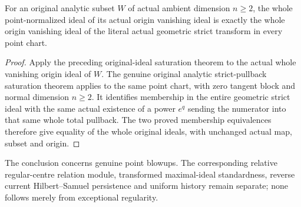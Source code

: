 \begin{corollary}
\label{hir:actual-original-point-normalized-geometric-strict-ideal}
\leanok
For an original analytic subset $W$ of actual ambient dimension $n\ge2$,
the whole point-normalized ideal of its actual origin vanishing ideal is
exactly the whole origin vanishing ideal of the literal actual geometric
strict transform in every point chart.
\end{corollary}
\begin{proof}
Apply the preceding original-ideal saturation theorem to the actual
whole vanishing origin ideal of $W$. The genuine original analytic
strict-pullback saturation theorem applies to the same point chart,
with zero tangent block and normal dimension $n\ge2$. It identifies
membership in the entire geometric strict ideal with the same actual
existence of a power $e^q$ sending the numerator into that same whole
total pullback. The two proved membership equivalences therefore give
equality of the whole original ideals, with unchanged actual map,
subset and origin.
\end{proof}

\begin{remark}
The conclusion concerns genuine point blowups. The corresponding relative
regular-centre relation module, transformed maximal-ideal standardness,
reverse current Hilbert--Samuel persistence and uniform history remain
separate; none follows merely from exceptional regularity.
\end{remark}
